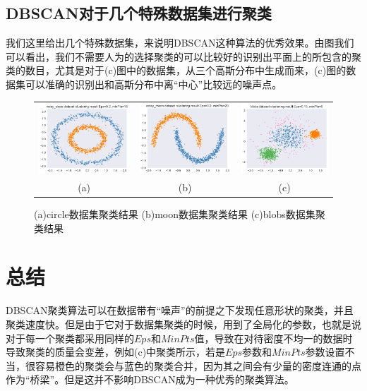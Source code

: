 \documentclass[UTF8, 12pt]{ctexart}
\begin{document}
\subsection{DBSCAN对于几个特殊数据集进行聚类}
我们这里给出几个特殊数据集，来说明DBSCAN这种算法的优秀效果。由图我们可以看出，我们不需要人为的选择聚类的可以比较好的识别出平面上的所包含的聚类的数目，尤其是对于(c)图中的数据集，从三个高斯分布中生成而来，(c)图的数据集可以准确的识别出和高斯分布中离“中心”比较远的噪声点。
\begin{figure}[H]
	\centering
	\begin{tabular}{ccc}
		\includegraphics[width=0.31\linewidth]{..//Plots//noisy_circleClusteringResults.pdf}  & 
		\includegraphics[width=0.315\linewidth]{..//Plots//noisy_moonClusteringResults.pdf} &
		\includegraphics[width=0.304\linewidth]{..//Plots//blobsClusteringResults.pdf} \\
		(a) & (b) & (c)\\
	\end{tabular}
	\caption{(a)circle数据集聚类结果 (b)moon数据集聚类结果 (c)blobs数据集聚类结果}
	\label{Fig:4}
	\vspace{-0.5em}
\end{figure}

\section{总结}
DBSCAN聚类算法可以在数据带有“噪声”的前提之下发现任意形状的聚类，并且聚类速度快。但是由于它对于数据集聚类的时候，用到了全局化的参数，也就是说对于每一个聚类都采用同样的$Eps$和$MinPts$值，导致在对待密度不均一的数据时导致聚类的质量会变差，例如(c)中聚类所示，若是$Eps$参数和$MinPts$参数设置不当，很容易橙色的聚类会与蓝色的聚类合并，因为其之间会有少量的密度连通的点作为“桥梁”。但是这并不影响DBSCAN成为一种优秀的聚类算法。
  
  
\end{document}
